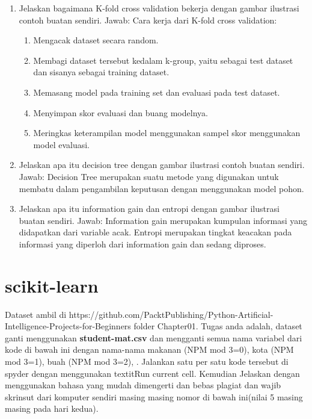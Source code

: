 \begin{enumerate}
\item
Jelaskan bagaimana K-fold cross validation bekerja dengan gambar ilustrasi contoh buatan sendiri.
\newline Jawab:
\newline Cara kerja dari K-fold cross validation:
\begin{enumerate}
	\item Mengacak dataset secara random.
	\item Membagi dataset tersebut kedalam k-group, yaitu sebagai test dataset dan sisanya sebagai training dataset.
	\item Memasang model pada training set dan evaluasi pada test dataset.
	\item Menyimpan skor evaluasi dan buang modelnya.
	\item Meringkas keterampilan model menggunakan sampel skor menggunakan	model evaluasi.
\end{enumerate}

\item
Jelaskan apa itu decision tree dengan gambar ilustrasi contoh buatan sendiri.
\newline Jawab:
\newline Decision Tree merupakan suatu metode yang digunakan untuk membatu dalam pengambilan keputusan dengan menggunakan model pohon.

\item
Jelaskan apa itu information gain dan entropi dengan gambar ilustrasi buatan sendiri.
\newline Jawab:
\newline Information gain merupakan kumpulan informasi yang didapatkan dari variable acak.
\newline Entropi merupakan tingkat keacakan pada informasi yang diperloh dari information gain dan sedang diproses.

\end{enumerate}

\newpage
\section{scikit-learn}
Dataset ambil di https://github.com/PacktPublishing/Python-Artificial-Intelligence-Projects-for-Beginners folder Chapter01.
Tugas anda adalah, dataset ganti menggunakan \textbf{student-mat.csv} dan mengganti semua nama variabel dari kode di bawah ini dengan nama-nama makanan (NPM mod 3=0), kota (NPM mod 3=1), buah (NPM mod 3=2), . Jalankan satu per satu kode tersebut di spyder dengan menggunakan textit{Run current cell}. Kemudian Jelaskan dengan menggunakan bahasa yang mudah dimengerti dan bebas plagiat dan wajib skrinsut dari komputer sendiri masing masing nomor di bawah ini(nilai 5 masing masing pada hari kedua).

